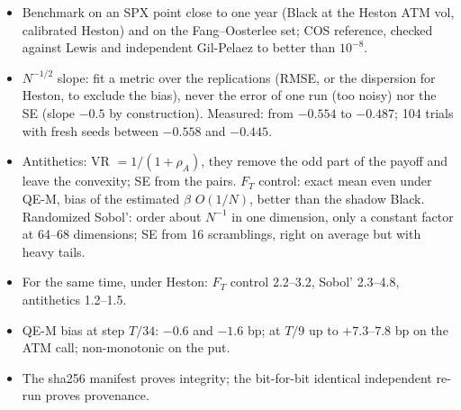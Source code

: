 \begin{riassunto}
\begin{itemize}
\item Benchmark on an SPX point close to one year (Black at the Heston ATM vol, calibrated Heston) and on the
Fang--Oosterlee set; COS reference, checked against Lewis and independent Gil-Pelaez to better than $10^{-8}$.
\item $N^{-1/2}$ slope: fit a metric over the replications (RMSE, or the dispersion for Heston, to exclude the bias),
never the error of one run (too noisy) nor the SE (slope $-0.5$ by construction). Measured: from $-0.554$ to $-0.487$;
104 trials with fresh seeds between $-0.558$ and $-0.445$.
\item Antithetics: VR $=1/(1+\rho_A)$, they remove the odd part of the payoff and leave the convexity; SE from the
pairs. $F_T$ control: exact mean even under QE-M, bias of the estimated $\hat\beta$ $O(1/N)$, better than the shadow
Black. Randomized Sobol': order about $N^{-1}$ in one dimension, only a constant factor at 64--68 dimensions; SE from
16 scramblings, right on average but with heavy tails.
\item For the same time, under Heston: $F_T$ control 2.2--3.2, Sobol' 2.3--4.8, antithetics 1.2--1.5.
\item QE-M bias at step $T/34$: $-0.6$ and $-1.6$ bp; at $T/9$ up to $+7.3$--$7.8$ bp on the ATM call; non-monotonic
on the put.
\item The sha256 manifest proves integrity; the bit-for-bit identical independent re-run proves provenance.
\end{itemize}
\end{riassunto}


